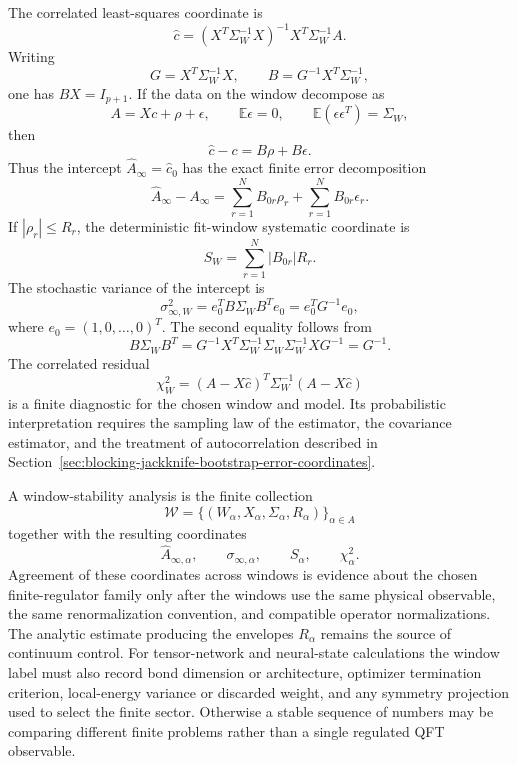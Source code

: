 The correlated least-squares coordinate is
\begin{equation}
  \widehat c
  =
  (X^T\Sigma_W^{-1}X)^{-1}X^T\Sigma_W^{-1}A .
  \label{eq:correlated-fit-coordinate}
\end{equation}
Writing
\[
  G=X^T\Sigma_W^{-1}X,\qquad
  B=G^{-1}X^T\Sigma_W^{-1},
\]
one has \(BX=I_{p+1}\).  If the data on the window decompose as
\begin{equation}
  A=Xc+\rho+\epsilon,
  \qquad
  \mathbb E\epsilon=0,\qquad
  \mathbb E(\epsilon\epsilon^T)=\Sigma_W ,
  \label{eq:correlated-fit-data-decomposition}
\end{equation}
then
\begin{equation}
  \widehat c-c=B\rho+B\epsilon .
  \label{eq:correlated-fit-error-decomposition}
\end{equation}
Thus the intercept \(\widehat A_\infty=\widehat c_0\) has the exact finite
error decomposition
\[
  \widehat A_\infty-A_\infty
  =
  \sum_{r=1}^N B_{0r}\rho_r
  +
  \sum_{r=1}^N B_{0r}\epsilon_r .
\]
If \(|\rho_r|\leq R_r\), the deterministic fit-window systematic coordinate is
\begin{equation}
  S_W=\sum_{r=1}^N |B_{0r}|R_r .
  \label{eq:correlated-fit-systematic-coordinate}
\end{equation}
The stochastic variance of the intercept is
\begin{equation}
  \sigma_{\infty,W}^2
  =
  e_0^T B\Sigma_WB^Te_0
  =
  e_0^TG^{-1}e_0 ,
  \label{eq:correlated-fit-intercept-variance}
\end{equation}
where \(e_0=(1,0,\ldots,0)^T\).  The second equality follows from
\[
  B\Sigma_WB^T
  =
  G^{-1}X^T\Sigma_W^{-1}\Sigma_W\Sigma_W^{-1}XG^{-1}
  =
  G^{-1}.
\]
The correlated residual
\begin{equation}
  \chi_W^2
  =
  (A-X\widehat c)^T\Sigma_W^{-1}(A-X\widehat c)
  \label{eq:correlated-fit-chi-square-coordinate}
\end{equation}
is a finite diagnostic for the chosen window and model.  Its probabilistic
interpretation requires the sampling law of the estimator, the covariance
estimator, and the treatment of autocorrelation described in
Section~\ref{sec:blocking-jackknife-bootstrap-error-coordinates}.

A window-stability analysis is the finite collection
\[
  \mathcal W=\{(W_\alpha,X_\alpha,\Sigma_\alpha,R_\alpha)\}_{\alpha\in A}
\]
together with the resulting coordinates
\[
  \widehat A_{\infty,\alpha},\qquad
  \sigma_{\infty,\alpha},\qquad
  S_\alpha,\qquad
  \chi_\alpha^2 .
\]
Agreement of these coordinates across windows is evidence about the chosen
finite-regulator family only after the windows use the same physical
observable, the same renormalization convention, and compatible operator
normalizations.  The analytic estimate producing the envelopes
\(R_\alpha\) remains the source of continuum control.  For tensor-network and
neural-state calculations the window label must also record bond dimension or
architecture, optimizer termination criterion, local-energy variance or
discarded weight, and any symmetry projection used to select the finite
sector.  Otherwise a stable sequence of numbers may be comparing different
finite problems rather than a single regulated QFT observable.

